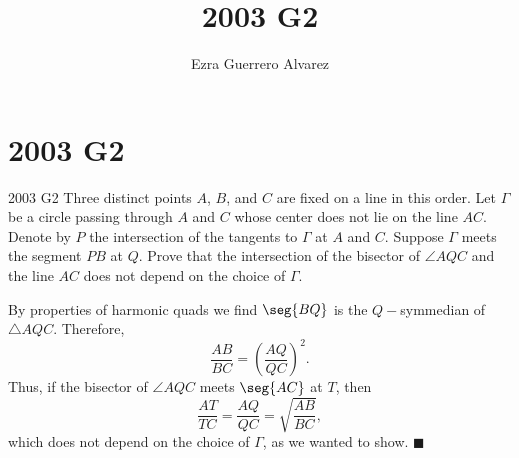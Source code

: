 \documentclass[14pt]{article}
\title{2003 G2}
\author{Ezra Guerrero Alvarez}
\begin{document}
\maketitle
	
\section*{2003 G2}

\begin{statement}{2003 G2}
	Three distinct points $A$, $B$, and $C$ are fixed on a line in this order.  Let $\Gamma$ be a circle passing through $A$ and $C$ whose center does not lie on the line $AC$.  Denote by $P$ the intersection of the tangents to $\Gamma$ at $A$ and $C$.  Suppose $\Gamma$ meets the segment $PB$ at $Q$.  Prove that the intersection of the bisector of $\angle AQC$ and the line $AC$ does not depend on the choice of $\Gamma$.
\end{statement}
By properties of harmonic quads we find $\seg{BQ}$ is the $Q-$symmedian of $\triangle AQC$. Therefore,
\[ \frac{AB}{BC}=\left(\frac{AQ}{QC}\right)^2. \]
Thus, if the bisector of $\angle AQC$ meets $\seg{AC}$ at $T$, then
\[ \frac{AT}{TC}=\frac{AQ}{QC}=\sqrt{\frac{AB}{BC}}, \]
which does not depend on the choice of $\Gamma$, as we wanted to show. $\blacksquare$ 
	
\end{document}
